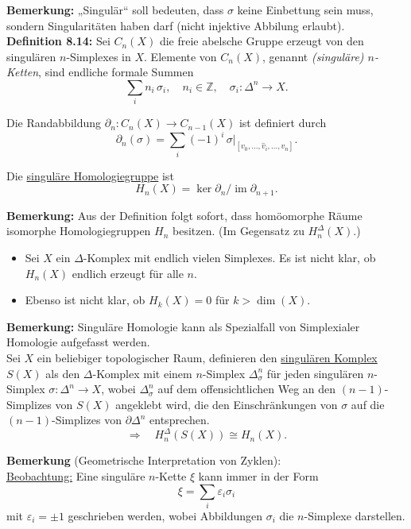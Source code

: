 \documentclass[fleqn, 12pt, letterpaper]{article}
\begin{document}
\textbf{Bemerkung:} „Singulär“ soll bedeuten, dass $\sigma$ keine Einbettung sein muss, sondern Singularitäten haben darf (nicht injektive Abbilung erlaubt).\\

\textbf{Definition 8.14:} Sei $C_n(X)$ die freie abelsche Gruppe erzeugt von den singulären $n$-Simplexes in $X$. Elemente von $C_n(X)$, genannt \emph{(singuläre) $n$-Ketten}, sind endliche formale Summen
\[
\sum_i n_i \, \sigma_i, \quad n_i \in \mathbb{Z}, \quad \sigma_i \colon \Delta^n \to X.
\]

Die Randabbildung $\partial_n \colon C_n(X) \to C_{n-1}(X)$ ist definiert durch
\[
\partial_n(\sigma) = \sum_i (-1)^i \, \sigma|_{[v_0, \ldots, \hat{v}_i, \ldots, v_n]}.
\]


Die \underline{singuläre Homologiegruppe} ist
\[
H_n(X) = \ker \partial_n / \operatorname{im} \partial_{n+1}.
\]

\textbf{Bemerkung:} Aus der Definition folgt sofort, dass homöomorphe Räume isomorphe Homologiegruppen $H_n$ besitzen. (Im Gegensatz zu $H_n^\Delta(X)$.)

\begin{itemize}
  \item Sei $X$ ein $\Delta$-Komplex mit endlich vielen Simplexes. Es ist nicht klar, ob $H_n(X)$ endlich erzeugt für alle $n$.
  \item Ebenso ist nicht klar, ob $H_k(X) = 0$ für $k > \dim(X)$.
\end{itemize}

\textbf{Bemerkung:} Singuläre Homologie kann als Spezialfall von Simplexialer Homologie aufgefasst werden.\\

Sei $X$ ein beliebiger topologischer Raum, definieren den \underline{singulären Komplex} $S(X)$ als den $\Delta$-Komplex mit einem $n$-Simplex $\Delta^n_\sigma$ 
für jeden singulären $n$-Simplex $\sigma \colon \Delta^n \to X$, wobei $\Delta^n_\sigma$ auf dem offensichtlichen Weg an den $(n-1)$-Simplizes von $S(X)$ angeklebt wird, die den Einschränkungen von $\sigma$ auf die $(n-1)$-Simplizes von $\partial \Delta^n$ entsprechen.
\[
\Rightarrow \quad H_n^\Delta(S(X)) \cong H_n(X).
\]

\textbf{Bemerkung} (Geometrische Interpretation von Zyklen):\\
\underline{Beobachtung:} Eine singuläre $n$-Kette $\xi$ kann immer in der Form 
\[
\xi = \sum_i \varepsilon_i \sigma_i
\]
mit $\varepsilon_i = \pm 1$ geschrieben werden, wobei Abbildungen $\sigma_i$ die $n$-Simplexe darstellen.\\
\end{document}
